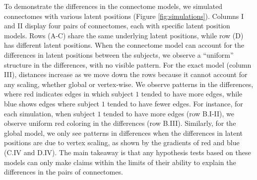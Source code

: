 To demonstrate the differences in the connectome models, we simulated connectomes with various latent positions (Figure \ref{fig:simulations}). 
Columns I and II display four pairs of connectomes, each with specific latent position models. Rows (A-C) share the same underlying latent positions, while row (D) has different latent positions. When the connectome model can account for the differences in latent positions between the subjects, we observe a ``uniform'' structure in the differences, with no visible pattern. For the exact model (column III), distances increase as we move down the rows because it cannot account for any scaling, whether global or vertex-wise. We observe patterns in the differences, where red indicates edges in which subject $1$ tended to have more edges, while blue shows edges where subject $1$ tended to have fewer edges. For instance, for each simulation, when subject $1$ tended to have more edges (row B.I-II), we observe uniform red coloring in the differences (row B.III). Similarly, for the global model, we only see patterns in differences when the differences in latent positions are due to vertex scaling, as shown by the gradients of red and blue (C.IV and D.IV). The main takeaway is that any hypothesis tests based on these models can only make claims within the limits of their ability to explain the differences in the pairs of connectomes.

